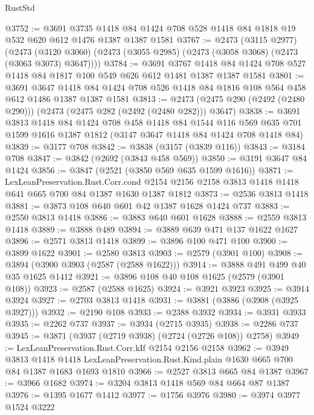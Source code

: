 \begin{lexlean}{RustStd}
\begin{coremodule}
{\begin{coremodule}
{{{{{{{{{{@3752 := @3691
    @3735
    @1418
    @84
    @1424
    @708
    @528
    @1418
    @84
    @1818
    @19
    @532
    @620
    @612
    @1476
    @1387
    @1387
    @1581
@3767 := @2473
    (@3115 @2977)
    (@2473 (@3120 @3060) (@2473 (@3055 @2985) (@2473 (@3058 @3068) (@2473 (@3063 @3073) @3647))))
@3784 := @3691
    @3767
    @1418
    @84
    @1424
    @708
    @527
    @1418
    @84
    @1817
    @100
    @549
    @626
    @612
    @1481
    @1387
    @1387
    @1581
@3801 := @3691
    @3647
    @1418
    @84
    @1424
    @708
    @526
    @1418
    @84
    @1816
    @108
    @564
    @458
    @612
    @1486
    @1387
    @1387
    @1581
@3813 := @2473 (@2475 @290 (@2492 (@2480 @290))) (@2473 (@2475 @282 (@2492 (@2480 @282))) @3647)
@3838 := @3691
    @3813
    @1418
    @84
    @1424
    @708
    @458
    @1418
    @84
    @1544
    @116
    @569
    @635
    @701
    @1599
    @1616
    @1387
    @1812
    (@3147 @3647 @1418 @84 @1424 @708 @1418 @84)
@3839 := @3177 @708
@3842 := @3838 (@3157 (@3839 @116))
@3843 := @3184 @708
@3847 := @3842 (@2692 (@3843 @458 @569))
@3850 := @3191 @3647 @84 @1424
@3856 := @3847 (@2521 (@3850 @569 @635 @1599 @1616))
@3871 := LexLeanPreservation.Rust.Corr.cond
    @2154
    @2156
    @2158
    @3813
    @1418
    @1418
    @641
    @665
    @700
    @84
    @1387
    @1630
    @1387
    @1812
@3873 := @2536 @3813 @1418
@3881 := @3873 @108 @640 @601 @42 @1387 @1628 @1424 @737
@3883 := @2550 @3813 @1418
@3886 := @3883 @640 @601 @1628
@3888 := @2559 @3813 @1418
@3889 := @3888 @489
@3894 := @3889 @639 @471 @137 @1622 @1627
@3896 := @2571 @3813 @1418
@3899 := @3896 @100 @471 @100
@3900 := @3899 @1622
@3901 := @2580 @3813
@3903 := @2579 (@3901 @100)
@3908 := @3894 (@3900 @3903 (@2587 (@2588 @1622)))
@3914 := @3888 @491 @499 @40 @35 @1625 @1412
@3921 := @3896 @108 @40 @108 @1625 (@2579 (@3901 @108))
@3923 := @2587 (@2588 @1625)
@3924 := @3921 @3923
@3925 := @3914 @3924
@3927 := @2703 @3813 @1418
@3931 := @3881 (@3886 (@3908 (@3925 @3927)))
@3932 := @2190 @108
@3933 := @2388 @3932
@3934 := @3931 @3933
@3935 := @2262 @737
@3937 := @3934 (@2715 @3935)
@3938 := @2286 @737
@3945 := @3871 (@3937 (@2719 @3938) (@2724 (@2726 @108)) @2758)
@3949 := LexLeanPreservation.Rust.Corr.kIf @2154 @2156 @2158
@3962 := @3949
    @3813
    @1418
    @1418
    LexLeanPreservation.Rust.Kind.plain
    @1630
    @665
    @700
    @84
    @1387
    @1683
    @1693
    @1810
@3966 := @2527 @3813 @665 @84 @1387
@3967 := @3966 @1682
@3974 := @3204 @3813 @1418 @569 @84 @664 @87 @1387
@3976 := @1395 @1677 @1412
@3977 := @1756 @3976
@3980 := @3974 @3977 @1524 @3222
}}}}}}}}}}
\end{coremodule}}
\end{coremodule}
\end{lexlean}
